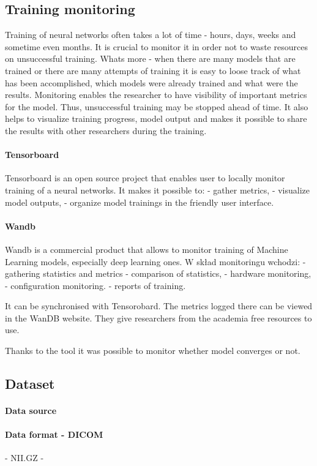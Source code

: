 \newpage 
\subsection{Training monitoring}
Training of neural networks often takes a lot of time - hours, days, weeks and sometime even months. It is crucial to monitor it in order not to waste resources on unsuccessful training. Whats more - when there are many models that are trained or there are many attempts of training it is easy to loose track of what has been accomplished, which models were already trained and what were the results. 
Monitoring enables the researcher to have visibility of important metrics for the model. Thus, unsuccessful training may be stopped ahead of time. It also helps to visualize training progress, model output and makes it possible to share the results with other researchers during the training. 
\paragraph{Tensorboard}
Tensorboard is an open source project that enables user to locally monitor training of a neural networks. It makes it possible to:
- gather metrics,
- visualize model outputs,
- organize model trainings in the friendly user interface.

\paragraph{Wandb}
Wandb is a commercial product that allows to monitor training of Machine Learning models, especially deep learning ones. W skład monitoringu wchodzi:
- gathering statistics and metrics
- comparison of statistics,
- hardware monitoring,
- configuration monitoring. 
- reports of training. 

It can be synchronised with Tensorobard. The metrics logged there can be viewed in the WanDB website. They give researchers from the academia free resources to use. 

Thanks to the tool it was possible to monitor whether model converges or not.

\newpage
\subsection{Dataset}
\paragraph{Data source}
\paragraph{Data format - DICOM}
- NII.GZ
- 
